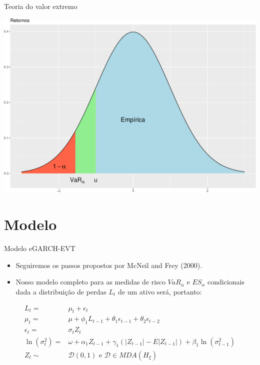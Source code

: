 \documentclass[ignorenonframetext,]{beamer}
\providecommand{\tightlist}{%
\setlength{\itemsep}{0pt}\setlength{\parskip}{0pt}}
\begin{document}
\begin{frame}{Teoria do valor extremo}

\includegraphics{artigo-apresentacao_files/figure-beamer/pot-1.pdf}

\end{frame}

\section{Modelo}\label{modelo}

\begin{frame}{Modelo eGARCH-EVT}

\begin{itemize}
\tightlist
\item
  Seguiremos os passos propostos por McNeil and Frey (2000).
\item
  Nosso modelo completo para as medidas de risco \(VaR_\alpha\) e
  \(ES_\alpha\) condicionais dada a distribuição de perdas \(L_t\) de um
  ativo será, portanto:
\end{itemize}

\begin{align*}
L_t=&\mu_t+\epsilon_t \\
\mu_t=&\mu+ \phi_1 L_{t-1}+ \theta_1\epsilon_{t-1}+ \theta_2\epsilon_{t-2} \\
\epsilon_t=&\sigma_t Z_t\\
\ln(\sigma_t^2)=&\omega+ \alpha_1 Z_{t-1}+ \gamma_1(|Z_{t-1}|-E|Z_{t-1}|)+ \beta_1 \ln(\sigma_{t-1}^2) \\
Z_t\sim &\mathcal{D}(0,1) \text{ e } \mathcal{D} \in MDA(H_\xi)
\end{align*}

\end{frame}
\end{document}
